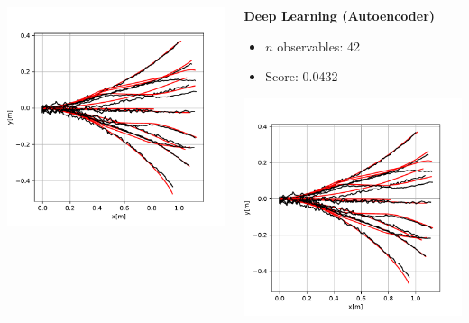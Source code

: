 \documentclass[shortpres,aspectratio=43]{beamer}
\begin{document}
\begin{frame}
\begin{columns}
\begin{column}{0.32\linewidth}
\begin{center}
		\includegraphics[width=0.8\linewidth]{./img/predictions_both.pdf}
		\end{center}
	\end{column}
	\begin{column}{0.32\linewidth}
		\small
		\textbf{Deep Learning (Autoencoder)}
		\begin{itemize}
			\item $n$ observables: 42
			\item Score: 0.0432
		\end{itemize}
		\begin{center}
		\includegraphics[width=0.8\linewidth]{./img/predictions_both.pdf}
		\end{center}
	\end{column}
\end{columns}


\end{frame}
\end{document}
